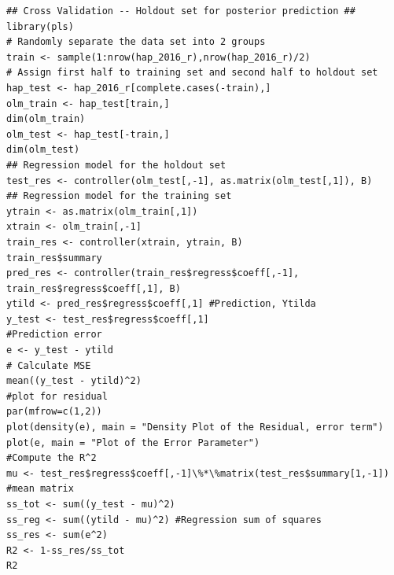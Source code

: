 \documentclass{article}
\begin{document}
\begin{verbatim}
## Cross Validation -- Holdout set for posterior prediction ##
library(pls)
# Randomly separate the data set into 2 groups
train <- sample(1:nrow(hap_2016_r),nrow(hap_2016_r)/2)
# Assign first half to training set and second half to holdout set
hap_test <- hap_2016_r[complete.cases(-train),]
olm_train <- hap_test[train,]
dim(olm_train)
olm_test <- hap_test[-train,]
dim(olm_test)
## Regression model for the holdout set 
test_res <- controller(olm_test[,-1], as.matrix(olm_test[,1]), B)
## Regression model for the training set 
ytrain <- as.matrix(olm_train[,1])
xtrain <- olm_train[,-1]
train_res <- controller(xtrain, ytrain, B)
train_res$summary
pred_res <- controller(train_res$regress$coeff[,-1], train_res$regress$coeff[,1], B)
ytild <- pred_res$regress$coeff[,1] #Prediction, Ytilda
y_test <- test_res$regress$coeff[,1]
#Prediction error
e <- y_test - ytild
# Calculate MSE
mean((y_test - ytild)^2)
#plot for residual
par(mfrow=c(1,2))
plot(density(e), main = "Density Plot of the Residual, error term")
plot(e, main = "Plot of the Error Parameter")
#Compute the R^2
mu <- test_res$regress$coeff[,-1]\%*\%matrix(test_res$summary[1,-1]) #mean matrix
ss_tot <- sum((y_test - mu)^2)
ss_reg <- sum((ytild - mu)^2) #Regression sum of squares
ss_res <- sum(e^2)
R2 <- 1-ss_res/ss_tot
R2

\end{verbatim}
\end{document}
